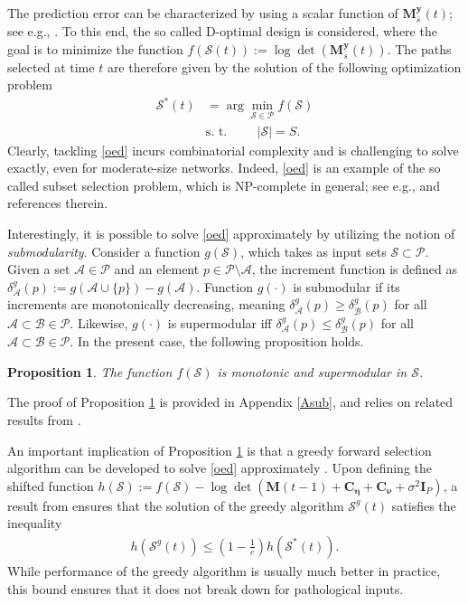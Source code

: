 \documentclass[draftcls,onecolumn,12pt]{IEEEtran}
\providecommand{\abs}[1]{\lvert#1\rvert}												\renewcommand{\b}[1]{\ensuremath{\mathbf{#1}}}		 							\newcommand{\bs}[1]{\ensuremath{\boldsymbol{#1}}}		 						\renewcommand{\c}[1]{\ensuremath{\mathcal{#1}}} 								\newcommand{\E}[1]{\ensuremath{\mathbb{E}\left[#1\right]}} 		  \newcommand{\Es}[1]{\ensuremath{\mathbb{E}^{*}\left[#1\right]}} \newcommand{\ind}{1\hspace{-1.6mm}1}														\newcommand{\norm}[1]{\ensuremath{\left\|#1\right\|}}						\newcommand{\tb}[1]{\ensuremath{\tilde{\mathbf{#1}}}}		 				\newcommand{\mat}[1]{\ensuremath{\begin{bmatrix}#1\end{bmatrix}}}
\def \My {{\b{M}^{\b{y}}_{\bar{s}}(t)}}
\def \ceta {{\b{C}_{\bs{\eta}}}}
\def \cnu {{\b{C}_{\bs{\nu}}}}
\def \P {{\c{P}}}
\def \S {{\c{S}}}
\def \A {{\c{A}}}
\def \B {{\c{B}}}
\theoremstyle{plain}\newtheorem{thm}{Theorem}
\newtheorem{prop}{Proposition}
\theoremstyle{definition}
\theoremstyle{remark}
\begin{document}
The prediction error can be characterized by using a scalar function of $\My$; see e.g., \cite{bach}.
To this end, the so called D-optimal design is considered, where the goal is to minimize the function $f(\S(t)):= \log\det(\My)$.
The paths selected at time $t$ are therefore given by the solution of the following optimization problem
\begin{align}
\S^{*}(t) &= \arg\min_{\S\in\P}  f(\S)\label{oed} \\
&\text{s. t.}\hspace{1cm} \abs{\S}= S. \label{budget}
\end{align}
Clearly, tackling \eqref{oed} incurs combinatorial complexity and is challenging to solve exactly, even for moderate-size networks.
Indeed, \eqref{oed} is an example of the so called subset selection problem, which is NP-complete in general; see e.g., \cite{kempe} and references therein.

Interestingly, it is possible to solve \eqref{oed} approximately by utilizing the notion of \emph{submodularity}. 
Consider a function $g(\S)$, which takes as input sets $\S \subset \P$. 
Given a set $\A \in \P$ and an element $p \in \P\setminus\A$, the increment function is defined as $\delta^g_{\A}(p):=g(\A\cup\{p\})-g(\A)$.
Function $g(\cdot)$ is submodular if its increments are monotonically decreasing, meaning $\delta^g_{\A}(p) \geq \delta^g_{\B}(p)$ for all $\A \subset \B \in \P$.
Likewise, $g(\cdot)$ is supermodular iff $\delta^g_{\A}(p) \leq \delta^g_{\B}(p)$ for all $\A \subset \B \in \P$.
In the present case, the following proposition holds.
\begin{prop}\label{propsub}
The function $f(\S)$ is monotonic and supermodular in $\S$.
\end{prop}
The proof of Proposition \ref{propsub} is provided in Appendix \ref{Asub}, and relies on related results from \cite{bach}. 

An important implication of Proposition \ref{propsub} is that a greedy forward selection algorithm can be developed to solve \eqref{oed} approximately \cite{nemh}.
Upon defining the shifted function $h(\S):=f(\S)-\log\det(\b{M}(t-1)+\ceta+\cnu+\sigma^2\b{I}_P)$, a result from \cite{nemh} ensures that the solution of the greedy algorithm $\S^g(t)$ satisfies the inequality
\begin{align}
h(\S^g(t)) \leq \left(1-\frac{1}{e}\right)h(\S^{*}(t)). \label{ratio}
\end{align}
While performance of the greedy algorithm is usually much better in practice, this bound ensures that it does not break down for pathological inputs.
\end{document}

